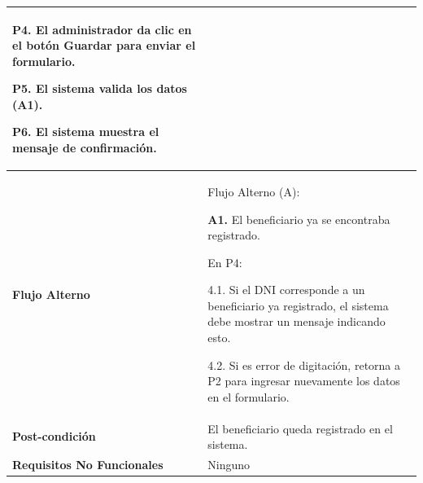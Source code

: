 \documentclass[12pt,a4paper]{article}
\begin{document}
\begin{center}
\begin{tabular}{|m{5.5cm}| m{9.5cm}|}
\textbf{P4.} El administrador da clic en el botón Guardar para enviar el formulario.

\textbf{P5.} El sistema valida los datos (A1).

\textbf{P6.} El sistema muestra el mensaje de confirmación.
\\
\hline 
\textbf{Flujo Alterno} &  Flujo Alterno (A):

\textbf{A1.} El beneficiario ya se encontraba registrado.

	En P4:
	
	4.1. Si el DNI corresponde a un beneficiario ya registrado, el sistema debe mostrar un mensaje indicando esto.
	
	4.2. Si es error de digitación, retorna a P2 para ingresar nuevamente los datos en el formulario. \\ 
\hline 
\textbf{Post-condición}  & El beneficiario queda registrado en el sistema. \\ 
\hline 
\textbf{Requisitos No Funcionales} & Ninguno \\ 
\hline 
\end{tabular}
\vspace{5mm}
\end{center}
\end{document}

